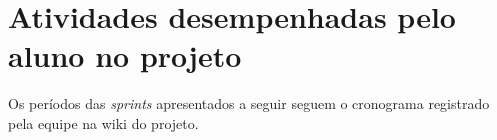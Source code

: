 \section[Atividades desempenhadas pelo aluno no projeto]{Atividades desempenhadas pelo aluno no projeto}

Os períodos das \textit{sprints} apresentados a seguir seguem o cronograma
registrado pela equipe na wiki do projeto.










